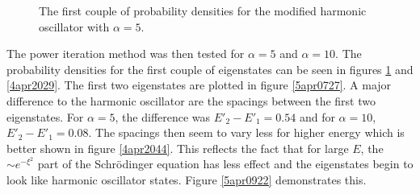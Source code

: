 \documentclass[twocolumn]{article}
\begin{document}
\begin{large}
\begin{figure}[b!]
    \caption{The first couple of probability densities for the modified harmonic oscillator with $\alpha=5$.}
    \label{4apr2003}
\end{figure}
The power iteration method was then tested for $\alpha=5$ and $\alpha=10$. The probability densities for the first couple of eigenstates can be seen in figures \ref{4apr2003} and \ref{4apr2029}. The first two eigenstates are plotted in figure \ref{5apr0727}. A major difference to the harmonic oscillator are the spacings between the first two eigenstates. For $\alpha=5$, the difference was $E'_2-E'_1 = 0.54$ and for $\alpha=10$, $E'_2-E'_1 = 0.08$. The spacings then seem to vary less for higher energy which is better shown in figure \ref{4apr2044}. This reflects the fact that for large $E$, the $\sim e^{-\xi^2}$ part of the Schrödinger equation has less effect and the eigenstates begin to look like harmonic oscillator states. Figure \ref{5apr0922} demonstrates this. 



\end{large}
\end{document}
